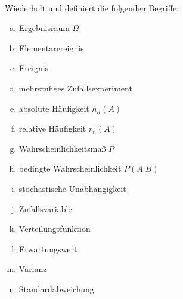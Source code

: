 \newcommand{\printpraesenzlsg}{false}
\newcommand{\printloesungen}{false}
\newcommand{\printbewertungen}{false}
\newcommand{\blattnummer}{1}



\iforiginal{}

	


\\
Wiederholt und definiert die folgenden Begriffe:
\begin{enumerate}[a)]
  \item Ergebnisraum $\Omega$
  \item Elementarereignis 
  \item Ereignis
  \item mehrstufiges Zufallsexperiment 
  \item absolute Häufigkeit $h_n(A)$
  \item relative Häufigkeit $r_n(A)$
  \item Wahrscheinlichkeitsmaß $P$
  \item bedingte Wahrscheinlichkeit $P(A|B)$
  \item stochastische Unabhängigkeit 
  \item Zufallsvariable 
  \item Verteilungsfunktion 
  \item Erwartungswert 
  \item Varianz 
  \item Standardabweichung 
\end{enumerate}


